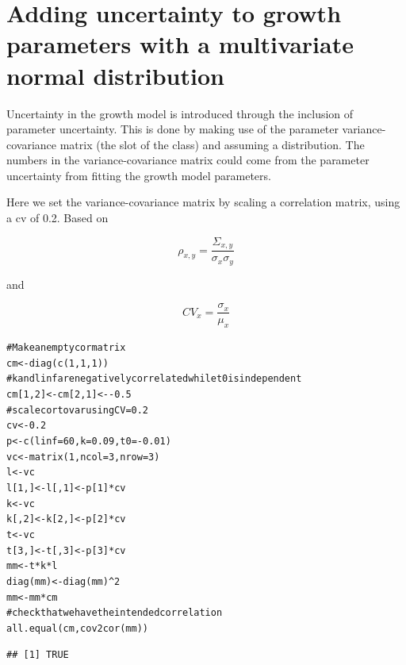 \documentclass[a4paper,english,10pt]{article}\usepackage[]{graphicx}\usepackage[]{color}
\makeatletter
\newcommand{\hlnum}[1]{\textcolor[rgb]{0.063,0.58,0.627}{#1}}%
\newcommand{\hlcom}[1]{\textcolor[rgb]{0.588,0.588,0.588}{#1}}%
\newcommand{\hlopt}[1]{\textcolor[rgb]{0.196,0.196,0.196}{#1}}%
\newcommand{\hlstd}[1]{\textcolor[rgb]{0.196,0.196,0.196}{#1}}%
\newcommand{\hlkwb}[1]{\textcolor[rgb]{0.627,0,0.314}{#1}}%
\newcommand{\hlkwc}[1]{\textcolor[rgb]{0,0.631,0.314}{#1}}%
\newcommand{\hlkwd}[1]{\textcolor[rgb]{0.78,0.227,0.412}{#1}}%
\newenvironment{kframe}{%
 \def\at@end@of@kframe{}%
 \ifinner\ifhmode%
  \def\at@end@of@kframe{\end{minipage}}%
  \begin{minipage}{\columnwidth}%
 \fi\fi%
 \def\FrameCommand##1{\hskip\@totalleftmargin \hskip-\fboxsep
 \colorbox{shadecolor}{##1}\hskip-\fboxsep
     \hskip-\linewidth \hskip-\@totalleftmargin \hskip\columnwidth}%
 \MakeFramed {\advance\hsize-\width
   \@totalleftmargin\z@ \linewidth\hsize
   \@setminipage}}%
 {\par\unskip\endMakeFramed%
 \at@end@of@kframe}
\newenvironment{knitrout}{}{} %
\makeatother
\begin{document}
\section{Adding uncertainty to growth parameters with a multivariate normal distribution}

Uncertainty in the growth model is introduced through the inclusion of parameter uncertainty.
This is done by making use of the parameter variance-covariance matrix (the  slot of the  class) and assuming a distribution. The numbers in the variance-covariance matrix could come from the parameter uncertainty from fitting the growth model parameters.

Here we set the variance-covariance matrix by scaling a correlation matrix, using a cv of 0.2. Based on 

$$\rho_{x,y}=\frac{\Sigma_{x,y}}{\sigma_x \sigma_y}$$

and 

$$CV_x=\frac{\sigma_x}{\mu_x}$$

\begin{knitrout}
\color{fgcolor}\begin{kframe}
\begin{alltt}
\hlcom{# Make an empty cor matrix}
\hlstd{cm} \hlkwb{<-} \hlkwd{diag}\hlstd{(}\hlkwd{c}\hlstd{(}\hlnum{1}\hlstd{,} \hlnum{1}\hlstd{,} \hlnum{1}\hlstd{))}
\hlcom{# k and linf are negatively correlated while t0 is independent}
\hlstd{cm[}\hlnum{1}\hlstd{,} \hlnum{2}\hlstd{]} \hlkwb{<-} \hlstd{cm[}\hlnum{2}\hlstd{,} \hlnum{1}\hlstd{]} \hlkwb{<-} \hlopt{-}\hlnum{0.5}
\hlcom{# scale cor to var using CV=0.2}
\hlstd{cv} \hlkwb{<-} \hlnum{0.2}
\hlstd{p} \hlkwb{<-} \hlkwd{c}\hlstd{(}\hlkwc{linf} \hlstd{=} \hlnum{60}\hlstd{,} \hlkwc{k} \hlstd{=} \hlnum{0.09}\hlstd{,} \hlkwc{t0} \hlstd{=} \hlopt{-}\hlnum{0.01}\hlstd{)}
\hlstd{vc} \hlkwb{<-} \hlkwd{matrix}\hlstd{(}\hlnum{1}\hlstd{,} \hlkwc{ncol} \hlstd{=} \hlnum{3}\hlstd{,} \hlkwc{nrow} \hlstd{=} \hlnum{3}\hlstd{)}
\hlstd{l} \hlkwb{<-} \hlstd{vc}
\hlstd{l[}\hlnum{1}\hlstd{, ]} \hlkwb{<-} \hlstd{l[,} \hlnum{1}\hlstd{]} \hlkwb{<-} \hlstd{p[}\hlnum{1}\hlstd{]} \hlopt{*} \hlstd{cv}
\hlstd{k} \hlkwb{<-} \hlstd{vc}
\hlstd{k[,} \hlnum{2}\hlstd{]} \hlkwb{<-} \hlstd{k[}\hlnum{2}\hlstd{, ]} \hlkwb{<-} \hlstd{p[}\hlnum{2}\hlstd{]} \hlopt{*} \hlstd{cv}
\hlstd{t} \hlkwb{<-} \hlstd{vc}
\hlstd{t[}\hlnum{3}\hlstd{, ]} \hlkwb{<-} \hlstd{t[,} \hlnum{3}\hlstd{]} \hlkwb{<-} \hlstd{p[}\hlnum{3}\hlstd{]} \hlopt{*} \hlstd{cv}
\hlstd{mm} \hlkwb{<-} \hlstd{t} \hlopt{*} \hlstd{k} \hlopt{*} \hlstd{l}
\hlkwd{diag}\hlstd{(mm)} \hlkwb{<-} \hlkwd{diag}\hlstd{(mm)}\hlopt{^}\hlnum{2}
\hlstd{mm} \hlkwb{<-} \hlstd{mm} \hlopt{*} \hlstd{cm}
\hlcom{# check that we have the intended correlation}
\hlkwd{all.equal}\hlstd{(cm,} \hlkwd{cov2cor}\hlstd{(mm))}
\end{alltt}
\begin{verbatim}
## [1] TRUE
\end{verbatim}
\end{kframe}
\end{knitrout}
\end{document}
